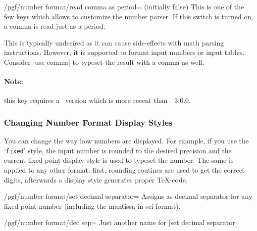 \documentclass[a4paper]{ltxdoc}
\begin{document}
\begin{key}{/pgf/number format/read comma as period= (initially false)}
    This is one of the few keys which allows to customize the number parser. If
    this switch is turned on, a comma is read just as a period.
\begin{codeexample}[]
\end{codeexample}
    This is typically undesired as it can cause side-effects with math parsing
    instructions. However, it is supported to format input numbers or input
    tables. Consider |use comma| to typeset the result with a comma as well.
\begin{codeexample}[]
\end{codeexample}

    \paragraph{Note:}

    this key requires a \pgfname\ version which is more recent
    than~\pgfname~3.0.0.
\end{key}


\subsubsection{Changing Number Format Display Styles}%
\label{sec:number:styles}

You can change the way how numbers are displayed. For example, if you use the
`\texttt{fixed}' style, the input number is rounded to the desired precision
and the current fixed point display style is used to typeset the number. The
same is applied to any other format: first, rounding routines are used to get
the correct digits, afterwards a display style generates proper \TeX{}-code.

\begin{key}{/pgf/number format/set decimal separator=}
    Assigns  as decimal separator for any fixed point number
    (including the mantissa in sci format).
\end{key}

\begin{key}{/pgf/number format/dec sep=}
    Just another name for |set decimal separator|.
\end{key}
\end{document}
